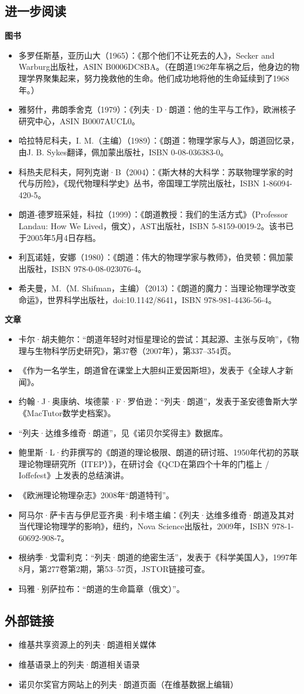 \subsection{进一步阅读}
\textbf{图书}
\begin{itemize}
\item 多罗任斯基，亚历山大（1965）：《那个他们不让死去的人》，Secker and Warburg出版社，ASIN B0006DC8BA。（在朗道1962年车祸之后，他身边的物理学界聚集起来，努力挽救他的生命。他们成功地将他的生命延续到了1968年。）
\item 雅努什，弗朗季舍克（1979）：《列夫·D·朗道：他的生平与工作》，欧洲核子研究中心，ASIN B0007AUCL0。
\item 哈拉特尼科夫，I. M.（主编）（1989）：《朗道：物理学家与人》，朗道回忆录，由J. B. Sykes翻译，佩加蒙出版社，ISBN 0-08-036383-0。
\item 科热夫尼科夫，阿列克谢·B（2004）：《斯大林的大科学：苏联物理学家的时代与历险》，《现代物理科学史》丛书，帝国理工学院出版社，ISBN 1-86094-420-5。
\item 朗道-德罗班采娃，科拉（1999）：《朗道教授：我们的生活方式》（Professor Landau: How We Lived，俄文），AST出版社，ISBN 5-8159-0019-2。该书已于2005年5月4日存档。
\item 利瓦诺娃，安娜（1980）：《朗道：伟大的物理学家与教师》，伯灵顿：佩加蒙出版社，ISBN 978-0-08-023076-4。
\item 希夫曼，M.（M. Shifman，主编）（2013）：《朗道的魔力：当理论物理学改变命运》，世界科学出版社，doi:10.1142/8641，ISBN 978-981-4436-56-4。
\end{itemize}
\textbf{文章}
\begin{itemize}
\item 卡尔·胡夫鲍尔：“朗道年轻时对恒星理论的尝试：其起源、主张与反响”，《物理与生物科学历史研究》，第37卷（2007年），第337–354页。
\item 《作为一名学生，朗道曾在课堂上大胆纠正爱因斯坦》，发表于《全球人才新闻》。
\item 约翰·J·奥康纳、埃德蒙·F·罗伯逊：“列夫·朗道”，发表于圣安德鲁斯大学《MacTutor数学史档案》。
\item “列夫·达维多维奇·朗道”，见《诺贝尔奖得主》数据库。
\item 鲍里斯·L·约菲撰写的《朗道的理论极限、朗道的研讨班、1950年代初的苏联理论物理研究所（ITEP）》，在研讨会《QCD在第四个十年的门槛上 / Ioffefest》上发表的总结演讲。
\item 《欧洲理论物理杂志》2008年“朗道特刊”。
\item 阿马尔·萨卡吉与伊尼亚齐奥·利卡塔主编：《列夫·达维多维奇·朗道及其对当代理论物理学的影响》，纽约，Nova Science出版社，2009年，ISBN 978-1-60692-908-7。
\item 根纳季·戈雷利克：“列夫·朗道的绝密生活”，发表于《科学美国人》，1997年8月，第277卷第2期，第53–57页，JSTOR链接可查。
\item 玛雅·别萨拉布：“朗道的生命篇章（俄文）”。
\end{itemize}
\subsection{外部链接}
\begin{itemize}
\item 维基共享资源上的列夫·朗道相关媒体
\item 维基语录上的列夫·朗道相关语录
\item 诺贝尔奖官方网站上的列夫·朗道页面（在维基数据上编辑）
\end{itemize}